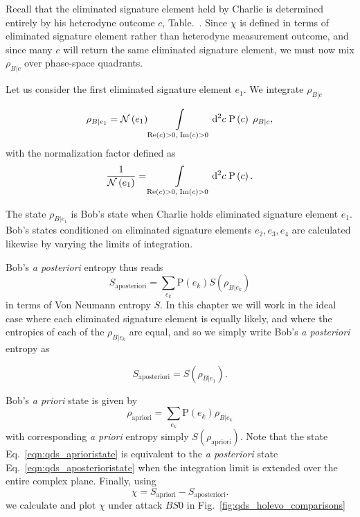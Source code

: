 Recall that the eliminated signature element held by Charlie is determined entirely by his heterodyne outcome $c$, Table.~. Since $\chi$ is defined in terms of eliminated signature element rather than heterodyne measurement outcome, and since many $c$ will return the same eliminated signature element, we must now mix $\rho_{B | c}$ over phase-space quadrants.


Let us consider the first eliminated signature element $e_1$. We integrate $\rho_{B | c}$

\begin{equation}\label{eqn:qds_aposterioristate}
\rho_{B | e_1} = \mathcal{N}\left(e_1\right) \int\limits_{\text{Re}\left(c\right) > 0, \; \text{Im}\left(c\right)>0} \mathop{}\!\mathrm{d^2} c \; \text{P}\left(c\right) \; \rho_{B | c},
\end{equation}
with the normalization factor defined as 
\begin{equation}
\frac{1}{\mathcal{N}\left(e_1\right)} = \int\limits_{\text{Re}\left(c\right) > 0, \; \text{Im}\left(c\right)>0} \mathop{}\!\mathrm{d^2} c \; \text{P}\left(c\right).
\end{equation}

\noindent The state $\rho_{B|e_1}$ is Bob's state when Charlie holds eliminated signature element $e_1$. Bob's states conditioned on eliminated signature elements $e_2, e_3, e_4$ are calculated likewise by varying the limits of integration.

Bob's \emph{a posteriori} entropy thus reads
\begin{equation}
S_{\text{aposteriori}} = \sum_{e_k} \text{P}\left(e_k\right) S\left(\rho_{B | e_k}\right)
\end{equation}
in terms of Von Neumann entropy $S$. In this chapter we will work in the ideal case where each eliminated signature element is equally likely, and where the entropies of each of the $\rho_{B | e_k}$ are equal, and so we simply write Bob's \emph{a posteriori} entropy as

\begin{equation}\label{eqn:aposteriori_entropy}
S_{\text{aposteriori}} = S\left(\rho_{B | e_1}\right).
\end{equation}

Bob's \emph{a priori} state is given by
\begin{equation}\label{eqn:qds_aprioristate}
\rho_{\text{apriori}} = \sum_{e_k} \text{P}\left(e_k\right) \rho_{B|e_k}
\end{equation}
with corresponding \emph{a priori} entropy simply $S\left(\rho_{\text{apriori}}\right)$. Note that the state Eq.~\ref{eqn:qds_aprioristate} is equivalent to the \emph{a posteriori} state Eq.~\ref{eqn:qds_aposterioristate} when the integration limit is extended over the entire complex plane. Finally, using
\begin{equation}
\chi = S_{\text{apriori}} - S_{\text{aposteriori}}.
\end{equation}
we calculate and plot $\chi$ under attack $BS0$ in Fig.~\ref{fig:qds_holevo_comparisons}

